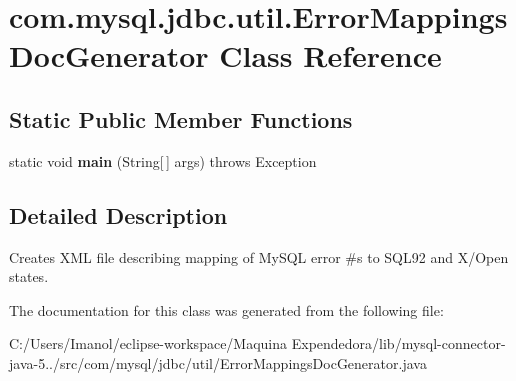\hypertarget{classcom_1_1mysql_1_1jdbc_1_1util_1_1_error_mappings_doc_generator}{}\section{com.\+mysql.\+jdbc.\+util.\+Error\+Mappings\+Doc\+Generator Class Reference}
\label{classcom_1_1mysql_1_1jdbc_1_1util_1_1_error_mappings_doc_generator}
\subsection*{Static Public Member Functions}
\begin{DoxyCompactItemize}
\item 
\mbox{\label{classcom_1_1mysql_1_1jdbc_1_1util_1_1_error_mappings_doc_generator_a03e7a7aab80dacb61aa385e53abc4d7a}} 
static void {\bfseries main} (String\mbox{[}$\,$\mbox{]} args)  throws Exception 
\end{DoxyCompactItemize}


\subsection{Detailed Description}
Creates X\+ML file describing mapping of My\+S\+QL error \#\textquotesingle{}s to S\+Q\+L92 and X/\+Open states. 

The documentation for this class was generated from the following file\+:\begin{DoxyCompactItemize}
\item 
C\+:/\+Users/\+Imanol/eclipse-\/workspace/\+Maquina Expendedora/lib/mysql-\/connector-\/java-\/5../src/com/mysql/jdbc/util/Error\+Mappings\+Doc\+Generator.\+java\end{DoxyCompactItemize}
